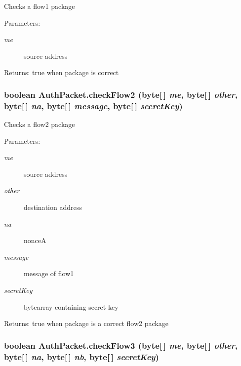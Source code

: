 Checks a flow1 package \begin{Desc}
\item[Parameters:]
\begin{description}
\item[{\em me}]source address \end{description}
\end{Desc}
\begin{Desc}
\item[Returns:]true when package is correct \end{Desc}
\hypertarget{class_auth_packet_c9}{
\subsubsection[checkFlow2]{\setlength{\rightskip}{0pt plus 5cm}boolean Auth\-Packet.check\-Flow2 (byte\mbox{[}$\,$\mbox{]} {\em me}, byte\mbox{[}$\,$\mbox{]} {\em other}, byte\mbox{[}$\,$\mbox{]} {\em na}, byte\mbox{[}$\,$\mbox{]} {\em message}, byte\mbox{[}$\,$\mbox{]} {\em secret\-Key})}}
\label{class_auth_packet_c9}


Checks a flow2 package \begin{Desc}
\item[Parameters:]
\begin{description}
\item[{\em me}]source address \item[{\em other}]destination address \item[{\em na}]nonce\-A \item[{\em message}]message of flow1 \item[{\em secret\-Key}]bytearray containing secret key \end{description}
\end{Desc}
\begin{Desc}
\item[Returns:]true when package is a correct flow2 package \end{Desc}
\hypertarget{class_auth_packet_c10}{
\subsubsection[checkFlow3]{\setlength{\rightskip}{0pt plus 5cm}boolean Auth\-Packet.check\-Flow3 (byte\mbox{[}$\,$\mbox{]} {\em me}, byte\mbox{[}$\,$\mbox{]} {\em other}, byte\mbox{[}$\,$\mbox{]} {\em na}, byte\mbox{[}$\,$\mbox{]} {\em nb}, byte\mbox{[}$\,$\mbox{]} {\em secret\-Key})}}
\label{class_auth_packet_c10}


